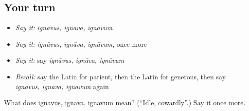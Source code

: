 \subsection*{Your turn}
\begin{itemize}
\raggedright
  \item \emph{Say it:} \emph{ignāvus, ignāva, ignāvum}
  \item \emph{Say it:} \emph{ignāvus, ignāva, ignāvum}, once more
  \item \emph{Say it:} say \emph{ignāvus, ignāva, ignāvum}
  \item \emph{Recall:} say the Latin for patient, then the Latin for generous, then say \emph{ignāvus, ignāva, ignāvum} again
\end{itemize}

\begin{tcolorbox}[breakable,colback=teal!4,colframe=teal!35!black,title={Before you move on}]
What does ignāvus, ignāva, ignāvum mean? (\textquotedblleft{}Idle, cowardly\textquotedblright{}.) Say it once more.
\end{tcolorbox}
